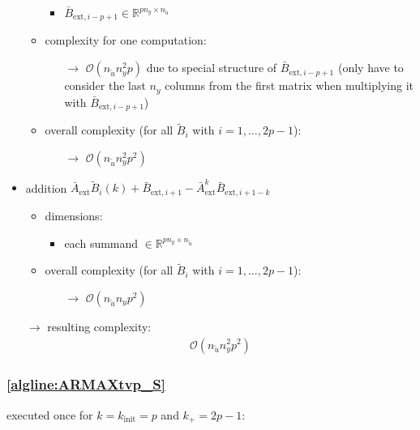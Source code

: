 \documentclass{article}
\begin{document}
\begin{itemize}
\begin{itemize}
\begin{itemize}
            \item $\bar{B}_{\text{ext},i-p+1} \in \mathbb{R}^{pn_y \times n_{\tilde{u}}}$
        \end{itemize}
        \item complexity for one computation:
        \begin{itemize}
            \item[$\rightarrow$] $\mathcal{O}(n_{\tilde{u}} n_y^2 p)$ due to special structure of $\bar{B}_{\text{ext},i-p+1}$ (only have to consider the last $n_y$ columns from the first matrix when multiplying it with $\bar{B}_{\text{ext},i-p+1}$)
        \end{itemize} 
        \item overall complexity (for all $\tilde{B}_i$ with $i=1,...,2p-1$):
        \begin{itemize}
            \item[$\rightarrow$] $\mathcal{O}(n_{\tilde{u}} n_y^2 p^2)$
        \end{itemize}
    \end{itemize}
    \item addition $\bar{A}_\text{ext}\tilde{B}_{i}(k) + \bar{B}_{\text{ext},i+1} - \bar{A}_\text{ext}^{k}\bar{B}_{\text{ext},i+1-k}$
    \begin{itemize}
        \item dimensions:
        \begin{itemize}
            \item each summand $\in \mathbb{R}^{pn_y \times n_{\tilde{u}}}$
        \end{itemize}
        \item overall complexity (for all $\tilde{B}_i$ with $i=1,...,2p-1$):
        \begin{itemize}
            \item[$\rightarrow$] $\mathcal{O}(n_{\tilde{u}} n_y p^2)$
        \end{itemize}
    \end{itemize}    
    \item[$\rightarrow$] resulting complexity: \begin{align*}
        \mathcal{O}(n_{\tilde{u}} n_y^2 p^2)
    \end{align*}
\end{itemize}

\subsubsection{\cref{algline:ARMAXtvp_S}} \label{sec:line5}
executed once for $k=k_{\text{init}}=p$ and $k_+=2p-1$:
\end{document}
